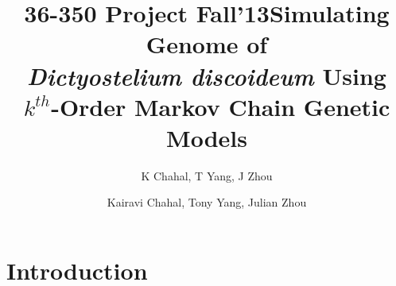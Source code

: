 \documentclass[xcolor=dvipsnames]{beamer} \usepackage{beamerthemesplit}
\author{K Chahal, T Yang, J Zhou}
\title{36-350 Project Fall'13}
\begin{document}
\begin{frame}
    \title{Simulating Genome of \\ \emph{Dictyostelium discoideum} Using \\ $k^{th}$-Order Markov Chain Genetic Models}
    \author{Kairavi Chahal, Tony Yang, Julian Zhou}
    
    \maketitle
\end{frame}


\section{Introduction}
\end{document}
